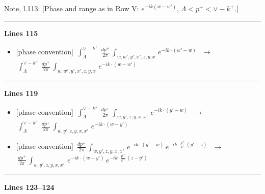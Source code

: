 \documentclass[10pt]{article}
\newenvironment{notebox}{\def\FrameCommand{{\color{notebar}\vrule width 1.5pt}\hspace{6pt}}\MakeFramed{\advance\hsize-\width\FrameRestore}\small}{\endMakeFramed}
\begin{document}
\begin{notebox}\textsf{\small Note, l.113:} [Phase and range as in Row V: $e^{-ik(w-w')}$, $\Lambda<p^{+}<\vee-k^{+}$.]\end{notebox}
\noindent\rule{\linewidth}{0.3pt}\par\noindent\textbf{Lines 115} \par
\begin{itemize}[leftmargin=2.2em,itemsep=1pt,topsep=2pt]
\item[\textbf{l.115}] \textsf{\small [phase convention]} $\displaystyle \,\int_{\Lambda}^{\vee-k^{+}}\, \frac{dp^{+}}{2\pi}\, \int_{w,w',y',x',z,y,x}\, e^{-ik\cdot (w'-w)}\,$\ $\longrightarrow$\ $\displaystyle \,\int_{\Lambda}^{\vee-k^{+}}\, \frac{dp^{+}}{2\pi}\, \int_{w,w',y',x',z,y,x}\, e^{-ik\cdot (w-w')}\,$
\end{itemize}
\noindent\rule{\linewidth}{0.3pt}\par\noindent\textbf{Lines 119} \par
\begin{itemize}[leftmargin=2.2em,itemsep=1pt,topsep=2pt]
\item[\textbf{l.119}] \textsf{\small [phase convention]} $\displaystyle \,\int_{\Lambda}^{\vee-k^{+}}\, \frac{dp^{+}}{2\pi}\, \int_{w,y',z,y,x,x'}\, e^{-ik\cdot (y'-w)}\,$\ $\longrightarrow$\ $\displaystyle \,\int_{\Lambda}^{\vee-k^{+}}\, \frac{dp^{+}}{2\pi}\, \int_{w,y',z,y,x,x'}\, e^{-ik\cdot (w-y')}\,$
\item[\textbf{l.119}] \textsf{\small [phase convention]} $\displaystyle \, \frac{dp^{+}}{2\pi}\, \int_{w,y',z,y,x,x'}\, e^{-ik\cdot (y'-w)}\, e^{-ik\cdot \frac{p^{+}}{k^{+}}\,(y'-z)}\,$\ $\longrightarrow$\ $\displaystyle \, \frac{dp^{+}}{2\pi}\, \int_{w,y',z,y,x,x'}\, e^{-ik\cdot (w-y')}\, e^{-ik\cdot \frac{p^{+}}{k^{+}}\,(z-y')}\,$
\end{itemize}
\noindent\rule{\linewidth}{0.3pt}\par\noindent\textbf{Lines 123--124} \par
\end{document}
